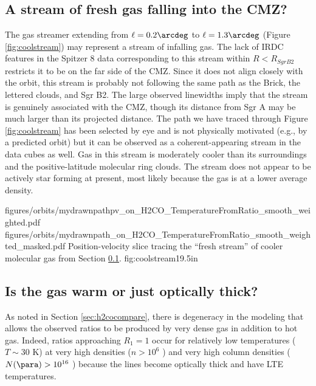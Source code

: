 \subsection{A stream of fresh gas falling into the CMZ?}
\label{sec:coolstream}
The gas streamer extending from $\ell=0.2\arcdeg$ to $\ell=1.3\arcdeg$ (Figure
\ref{fig:coolstream}) may represent a stream of infalling gas.  The lack of
IRDC features in the Spitzer 8 \um data corresponding to this stream within
$R<R_{SgrB2}$ restricts it to be on the far side of the CMZ.  Since it does not
align closely with the \citet{Kruijssen2014d} orbit, this stream is probably
not following the same path as the Brick, the lettered clouds, and Sgr B2.
The large observed linewidths imply that the stream is genuinely associated
with the CMZ, though its distance from Sgr A may be much larger than its
projected distance.  The path we have traced through Figure \ref{fig:coolstream}
has been selected by eye and is not physically motivated (e.g., by a predicted
orbit) but it can be observed as a coherent-appearing stream in the \thirteenco
data cubes as well.    Gas in this stream is moderately cooler than its
surroundings and the positive-latitude molecular ring clouds.  The stream does
not appear to be actively star forming at present, most likely because the gas
is at a lower average density.


\RotFigureTwoAA
{figures/orbits/mydrawnpathpv_on_H2CO_TemperatureFromRatio_smooth_weighted.pdf}
{figures/orbits/mydrawnpath_on_H2CO_TemperatureFromRatio_smooth_weighted_masked.pdf}
{Position-velocity slice tracing the ``fresh stream'' of cooler molecular
gas from Section \ref{sec:coolstream}.}
{fig:coolstream}{1}{9.5in}

\subsection{Is the gas warm or just optically thick?}
\label{sec:thickorwarm}
As noted in Section \ref{sec:h2cocompare}, there is degeneracy in the modeling
that allows the observed ratios to be produced by very dense gas in addition to
hot gas.  Indeed, ratios approaching $R_1=1$ occur for relatively low
temperatures ($T\sim30$ K) at very high densities ($n>10^{6}$ \percc)
and very high column densities ($N(\para)>10^{16}$ \perkms \persc) because
the lines become optically thick and have LTE temperatures.

